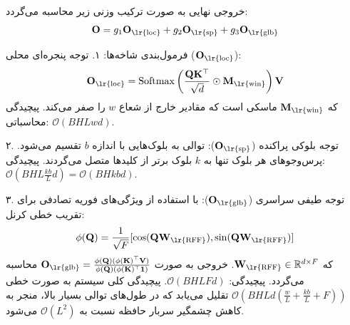 خروجی نهایی به صورت ترکیب وزنی زیر محاسبه می‌گردد:
\begin{equation}
    \mathbf{O} = g_1 \mathbf{O}_{\text{\lr{loc}}} + g_2 \mathbf{O}_{\text{\lr{sp}}} + g_3 \mathbf{O}_{\text{\lr{glb}}}
\end{equation}

فرمول‌بندی شاخه‌ها:
۱. توجه پنجره‌ای محلی ($\mathbf{O}_{\text{\lr{loc}}}$):
\begin{equation}
    \mathbf{O}_{\text{\lr{loc}}} = \operatorname{Softmax}\left(\frac{\mathbf{Q} \mathbf{K}^\top}{\sqrt{d}} \odot \mathbf{M}_{\text{\lr{win}}}\right) \mathbf{V}
\end{equation}
که $\mathbf{M}_{\text{\lr{win}}}$ ماسکی است که مقادیر خارج از شعاع $w$ را صفر می‌کند. پیچیدگی محاسباتی: $\mathcal{O}(BHLwd)$.

۲. توجه بلوکی پراکنده ($\mathbf{O}_{\text{\lr{sp}}}$): توالی به بلوک‌هایی با اندازه $b$ تقسیم می‌شود. پرس‌وجوهای هر بلوک تنها به $k$ بلوک برتر از کلیدها متصل می‌گردند. پیچیدگی: $\mathcal{O}(BHL \frac{kb}{L} d) = \mathcal{O}(BHkbd)$.

۳. توجه طیفی سراسری ($\mathbf{O}_{\text{\lr{glb}}}$): با استفاده از ویژگی‌های فوریه تصادفی  برای تقریب خطی کرنل:
\begin{equation}
    \phi(\mathbf{Q}) = \frac{1}{\sqrt{F}} [\cos(\mathbf{Q} \mathbf{W}_{\text{\lr{RFF}}}), \sin(\mathbf{Q} \mathbf{W}_{\text{\lr{RFF}}})]
\end{equation}
که $\mathbf{W}_{\text{\lr{RFF}}} \in \mathbb{R}^{d \times F}$. خروجی به صورت $\mathbf{O}_{\text{\lr{glb}}} = \frac{\phi(\mathbf{Q}) (\phi(\mathbf{K})^\top \mathbf{V})}{\phi(\mathbf{Q}) (\phi(\mathbf{K})^\top \mathbf{1})}$ محاسبه می‌گردد. پیچیدگی: $\mathcal{O}(BHLFd)$.
پیچیدگی کلی سیستم به صورت خطی $\mathcal{O}(BHLd(\frac{w}{L} + \frac{kb}{L} + F))$ تقلیل می‌یابد که در طول‌های توالی بسیار بالا، منجر به کاهش چشمگیر سربار حافظه نسبت به $\mathcal{O}(L^2)$ می‌شود.

